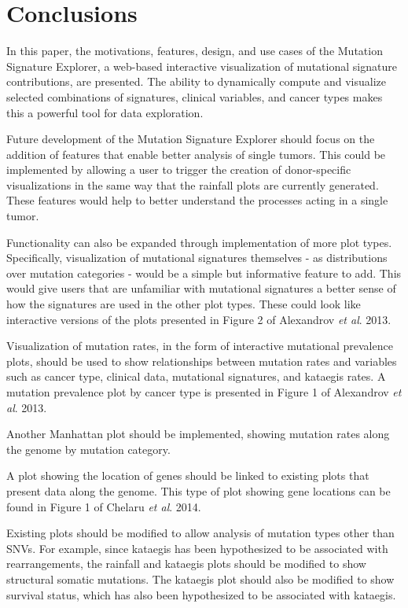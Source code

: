 \documentclass[12pt, letterpaper]{article}
\begin{document}
\section{Conclusions}
In this paper, the motivations, features, design, and use cases of the Mutation Signature Explorer, a web-based interactive visualization of mutational signature contributions, are presented. 
The ability to dynamically compute and visualize selected combinations of signatures, clinical variables, and cancer types makes this a powerful tool for data exploration.

Future development of the Mutation Signature Explorer should focus on the addition of features that enable better analysis of single tumors. 
This could be implemented by allowing a user to trigger the creation of donor-specific visualizations in the same way that the rainfall plots are currently generated.
These features would help to better understand the processes acting in a single tumor.

Functionality can also be expanded through implementation of more plot types.
Specifically, visualization of mutational signatures themselves - as distributions over mutation categories - would be a simple but informative feature to add.
This would give users that are unfamiliar with mutational signatures a better sense of how the signatures are used in the other plot types.
These could look like interactive versions of the plots presented in Figure 2 of Alexandrov \textit{et al}. 2013\cite{alexandrov2013signatures}.

Visualization of mutation rates, in the form of interactive mutational prevalence plots, should be used to show relationships between mutation rates and variables such as cancer type, clinical data, mutational signatures, and kataegis rates.
A mutation prevalence plot by cancer type is presented in Figure 1 of Alexandrov \textit{et al}. 2013\cite{alexandrov2013signatures}.

Another Manhattan plot should be implemented, showing mutation rates along the genome by mutation category.

A plot showing the location of genes should be linked to existing plots that present data along the genome.
This type of plot showing gene locations can be found in Figure 1 of Chelaru \textit{et al}. 2014\cite{chelaru2014epiviz}.

Existing plots should be modified to allow analysis of mutation types other than SNVs. 
For example, since kataegis has been hypothesized to be associated with rearrangements, the rainfall and kataegis plots should be modified to show structural somatic mutations. The kataegis plot should also be modified to show survival status, which has also been hypothesized to be associated with kataegis.
\end{document}
